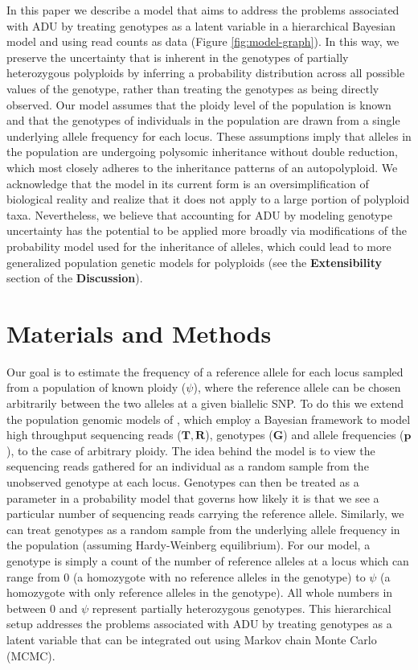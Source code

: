 \documentclass[11pt,english,letterpaper,oneside]{article}
\begin{document}
\medskip

In this paper we describe a model that aims to address the problems associated with ADU by treating genotypes as a latent variable in a hierarchical Bayesian model and using read counts as data (Figure \ref{fig:model-graph}). In this way, we preserve the uncertainty that is inherent in the genotypes of partially heterozygous polyploids by inferring a probability distribution across all possible values of the genotype, rather than treating the genotypes as being directly observed. Our model assumes that the ploidy level of the population is known and that the genotypes of individuals in the population are drawn from a single underlying allele frequency for each locus. These assumptions imply that alleles in the population are undergoing polysomic inheritance without double reduction, which most closely adheres to the inheritance patterns of an autopolyploid. We acknowledge that the model in its current form is an oversimplification of biological reality and realize that it does not apply to a large portion of polyploid taxa. Nevertheless, we believe that accounting for ADU by modeling genotype uncertainty has the potential to be applied more broadly via modifications of the probability model used for the inheritance of alleles, which could lead to more generalized population genetic models for polyploids (see the \textbf{Extensibility} section of the \textbf{Discussion}). 
\medskip

\section*{Materials and Methods}        %

\noindent Our goal is to estimate the frequency of a reference allele for each locus sampled from a population of known ploidy ($\psi$), where the reference allele can be chosen arbitrarily between the two alleles at a given biallelic SNP. To do this we extend the population genomic models of \cite{buerkle2013popModels}, which employ a Bayesian framework to model high throughput sequencing reads ($\bm{T},\bm{R}$), genotypes ($\bm{G}$) and allele frequencies ($\bm{p}$), to the case of arbitrary ploidy. The idea behind the model is to view the sequencing reads gathered for an individual as a random sample from the unobserved genotype at each locus. Genotypes can then be treated as a parameter in a probability model that governs how likely it is that we see a particular number of sequencing reads carrying the reference allele. Similarly, we can treat genotypes as a random sample from the underlying allele frequency in the population (assuming Hardy-Weinberg equilibrium). For our model, a genotype is simply a count of the number of reference alleles at a locus which can range from 0 (a homozygote with no reference alleles in the genotype) to $\psi$ (a homozygote with only reference alleles in the genotype). All whole numbers in between 0 and $\psi$ represent partially heterozygous genotypes. This hierarchical setup addresses the problems associated with ADU by treating genotypes as a latent variable that can be integrated out using Markov chain Monte Carlo (MCMC).
\end{document}
